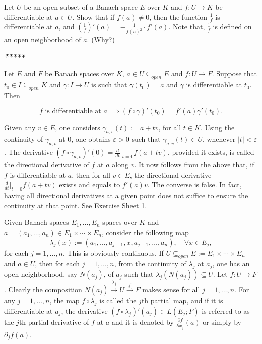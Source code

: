 \documentclass{book}
\begin{document}
Let $U$ be an open subset of a Banach space $E$ over $K$ and $f : U \to K$ be differentiable at $a \in U$. Show that if $f(a) \neq 0$, then the function $\frac{1}{f}$ is differentiable at $a$, and $\left(\frac{1}{f}\right)'(a) = -\frac{1}{f(a)^2} \cdot f'(a)$. Note that, $\frac{1}{f}$ is defined on an open neighborhood of $a$. (Why?)

\begin{center}
{\LARGE \textbf{\textit{*****}}}
\end{center}
Let $E$ and $F$ be Banach spaces over $K$, $a \in U \subseteq_{open} E$ and $f : U \to F$. Suppose that $t_0 \in I \subseteq_{open} K$ and $\gamma : I \to U$ is such that $\gamma(t_0) = a$ and $\gamma$ is differentiable at $t_0$. Then

\[
f \text{ is differentiable at } a \implies (f \circ \gamma)'(t_0) = f'(a)\gamma'(t_0).
\]

Given any $v \in E$, one considers $\gamma_{a,v}(t) := a + tv$, for all $t \in K$. Using the continuity of $\gamma_{a,v}$ at $0$, one obtains $\varepsilon > 0$ such that $\gamma_{a,v}(t) \in U$, whenever $|t| < \varepsilon$. The derivative $(f \circ \gamma_{a,v})'(0) = \frac{d}{dt}\big|_{t=0} f(a + tv)$, provided it exists, is called the directional derivative of $f$ at $a$ along $v$. It now follows from the above that, if $f$ is differentiable at $a$, then for all $v \in E$, the directional derivative $\frac{d}{dt}\big|_{t=0} f(a + tv)$ exists and equals to $f'(a)v$. The converse is false. In fact, having all directional derivatives at a given point does not suffice to ensure the continuity at that point. See Exercise Sheet 1.

Given Banach spaces $E_1, \ldots, E_n$ spaces over $K$ and $a = (a_1, \ldots, a_n) \in E_1 \times \cdots \times E_n$, consider the following map
\[
\lambda_j(x) := (a_1, \ldots, a_{j-1}, x, a_{j+1}, \ldots, a_n), \quad \forall x \in E_j,
\]
for each $j = 1, \ldots, n$. This is obviously continuous. If $U \subseteq_{open} E := E_1 \times \cdots \times E_n$ and $a \in U$, then for each $j = 1, \ldots, n$, from the continuity of $\lambda_j$ at $a_j$, one has an open neighborhood, say $N(a_j)$, of $a_j$ such that $\lambda_j(N(a_j)) \subseteq U$. Let $f : U \to F$. Clearly the composition $N(a_j) \xrightarrow{\lambda_j} U \xrightarrow{f} F$ makes sense for all $j = 1, \ldots, n$. For any $j = 1, \ldots, n$, the map $f \circ \lambda_j$ is called the $j$th partial map, and if it is differentiable at $a_j$, the derivative $(f \circ \lambda_j)'(a_j) \in L(E_j; F)$ is referred to as the $j$th partial derivative of $f$ at $a$ and it is denoted by $\frac{\partial f}{\partial x_j}(a)$ or simply by $\partial_j f(a)$.
\end{document}
